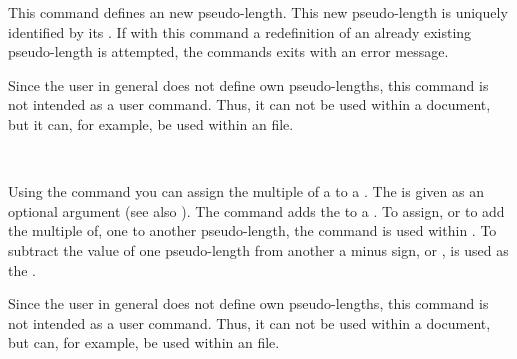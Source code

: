 \begin{Declaration}
\end{Declaration}
%
This command defines an new pseudo-length. This new pseudo-length is
uniquely identified by its . If with this command a
redefinition of an already existing pseudo-length is attempted, the
commands exits with an error message.

Since the user in general does not define own pseudo-lengths, this
command is not intended as a user command. Thus, it can not be used
within a document, but it can, for example, be used within an
 file.
%
%

\begin{Declaration}
    \\
\end{Declaration}
%
%
Using the command  you can assign the multiple of a
 to a . The  is given
as an optional argument (see also ). The
command  adds the  to a
. To assign, or to add the multiple of, one
 to another pseudo-length, the command
 is used within .  To subtract the
value of one pseudo-length from another  a minus
sign, or , is used as the .

Since the user in general does not define own pseudo-lengths, this
command is not intended as a user command. Thus, it can not be used
within a document, but can, for example, be used within an 
file.
%
%
%

